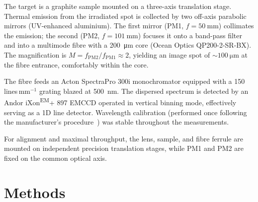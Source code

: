 \documentclass[
	parskip=half,
	a4paper,
]{scrarticle}
\begin{document}
The target is a graphite sample mounted on a three-axis translation stage. Thermal emission from the irradiated spot is collected by two off-axis parabolic mirrors (UV-enhanced aluminium). The first mirror (PM1, \(f=\SI{50}{\milli\metre}\)) collimates the emission; the second (PM2, \(f=\SI{101}{\milli\metre}\)) focuses it onto a band-pass filter and into a multimode fibre with a \SI{200}{\micro\metre} core (Ocean Optics QP200-2-SR-BX). The magnification is \(M = f_{\mathrm{PM2}}/f_{\mathrm{PM1}} \approx 2\), yielding an image spot of \(\sim\SI{100}{\micro\metre}\) at the fibre entrance, comfortably within the core.

The fibre feeds an Acton SpectraPro 300i monochromator equipped with a 150\,lines\,mm\(^{-1}\) grating blazed at \SI{500}{\nano\metre}. The dispersed spectrum is detected by an Andor iXon\textsuperscript{EM}+ 897 EMCCD operated in vertical binning mode, effectively serving as a 1D line detector.
Wavelength calibration (performed once following the manufacturer’s procedure~\cite{roobThermalRadiationUltrafast2025}) was stable throughout the measurements.

For alignment and maximal throughput, the lens, sample, and fibre ferrule are mounted on independent precision translation stages, while PM1 and PM2 are fixed on the common optical axis. 

\section{Methods}
\end{document}
